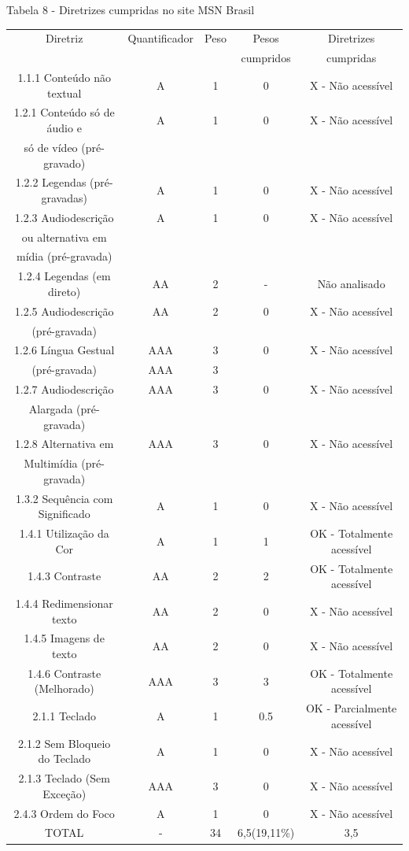 \documentclass[a4paper]{article}
\begin{document}
\begin{titlepage}
Tabela 8 - Diretrizes cumpridas no site MSN Brasil\\[-1cm]
\begin{center}
	\fontsize{8pt}{8pt}\selectfont	
	\begin{longtable}{|c|c|c|c|c|}
		\hline
		Diretriz & Quantificador & Peso & Pesos & Diretrizes\\
		& & & cumpridos & cumpridas\\
		\hline
		1.1.1 Conteúdo não textual & A & 1 & 0 & X - Não acessível \\
		\hline
		1.2.1 Conteúdo só de áudio e & A & 1 & 0 & X - Não acessível \\
		só de vídeo (pré-gravado) & & & & \\
		\hline
		1.2.2 Legendas (pré-gravadas) & A & 1 & 0 & X - Não acessível \\
		\hline
		1.2.3 Audiodescrição & A & 1 & 0 & X - Não acessível \\
		ou alternativa em & & & & \\
		mídia (pré-gravada) & & & & \\
		\hline
		1.2.4 Legendas (em direto) & AA & 2 & - & Não analisado \\
		\hline
		1.2.5 Audiodescrição & AA & 2 & 0 & X - Não acessível \\
		(pré-gravada) & & & & \\
		\hline
		1.2.6 Língua Gestual & AAA & 3 & 0 & X - Não acessível \\
		(pré-gravada) & AAA & 3 & & \\
		\hline
		1.2.7 Audiodescrição & AAA & 3 & 0 & X - Não acessível \\
		Alargada (pré-gravada) & & & & \\
		\hline
		1.2.8 Alternativa em & AAA & 3 & 0 & X - Não acessível \\
		Multimídia (pré-gravada) & & & & \\
		\hline
		1.3.2 Sequência com Significado & A & 1 & 0 & X - Não acessível \\
		\hline
		1.4.1 Utilização da Cor & A & 1 & 1 & OK - Totalmente acessível \\
		\hline
		1.4.3 Contraste & AA & 2 & 2 & OK - Totalmente acessível \\
		\hline
		1.4.4 Redimensionar texto & AA & 2 & 0 & X - Não acessível \\
		\hline
		1.4.5 Imagens de texto & AA & 2 & 0 & X - Não acessível \\
		\hline
		1.4.6 Contraste (Melhorado) & AAA & 3 & 3 & OK - Totalmente acessível \\
		\hline
		2.1.1 Teclado & A & 1 & 0.5 & OK - Parcialmente acessível \\
		\hline
		2.1.2 Sem Bloqueio do Teclado & A & 1 & 0 & X - Não acessível \\
		\hline
		2.1.3 Teclado (Sem Exceção) & AAA & 3 & 0 & X - Não acessível \\
		\hline
		2.4.3 Ordem do Foco & A & 1 & 0 & X - Não acessível\\
		\hline
		TOTAL & - & 34 & 6,5(19,11\%) & 3,5 \\
		\hline
	\end{longtable}
\end{center}


\end{titlepage}
\end{document}
